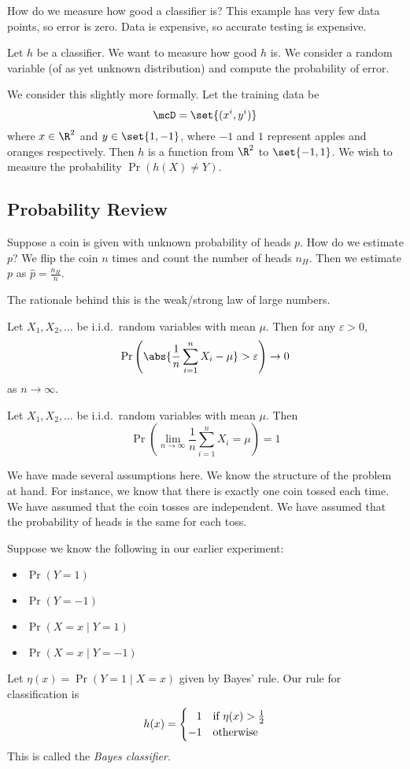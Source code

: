 How do we measure how good a classifier is?
This example has very few data points, so error is zero.
Data is expensive, so accurate testing is expensive.

Let $h$ be a classifier.
We want to measure how good $h$ is.
We consider a random variable (of as yet unknown distribution) and compute
the probability of error.

We consider this slightly more formally.
Let the training data be \[
    \mcD = \set{(x^i, y^i)}
\] where $x \in \R^2$ and $y \in \set{1, -1}$, where $-1$ and $1$ represent
apples and oranges respectively.
Then $h$ is a function from $\R^2$ to $\set{-1, 1}$.
We wish to measure the probability $\Pr(h(X) \ne Y)$.

\subsection{Probability Review} \label{sec:probability_review}
Suppose a coin is given with unknown probability of heads $p$.
How do we estimate $p$?
We flip the coin $n$ times and count the number of heads $n_H$.
Then we estimate $p$ as $\hat{p} = \frac{n_H}{n}$.

The rationale behind this is the weak/strong law of large numbers.
\begin{theorem} \label{thm:probability_review:wlln}
    Let $X_1, X_2, \ldots$ be i.i.d.~random variables with mean $\mu$.
    Then for any $\varepsilon > 0$, \[
        \Pr\left(\abs{\frac{1}{n} \sum_{i=1}^n X_i - \mu} > \varepsilon\right)
        \to 0
    \] as $n \to \infty$.
\end{theorem}

\begin{theorem} \label{thm:probability_review:slln}
    Let $X_1, X_2, \ldots$ be i.i.d.~random variables with mean $\mu$.
    Then \[
        \Pr\left(\lim_{n \to \infty} \frac{1}{n} \sum_{i=1}^n X_i = \mu\right)
        = 1
    \]
\end{theorem}
We have made several assumptions here.
We know the structure of the problem at hand.
For instance, we know that there is exactly one coin tossed each time.
We have assumed that the coin tosses are independent.
We have assumed that the probability of heads is the same for each toss.

Suppose we know the following in our earlier experiment:
\begin{itemize}
    \item $\Pr(Y = 1)$
    \item $\Pr(Y = -1)$
    \item $\Pr(X = x \mid Y = 1)$
    \item $\Pr(X = x \mid Y = -1)$
\end{itemize}
Let $\eta(x) = \Pr(Y = 1 \mid X = x)$ given by Bayes' rule.
Our rule for classification is \[
    h(x) = \begin{cases}
        \hphantom{-}1 & \text{if } \eta(x) > \frac{1}{2} \\
        -1 & \text{otherwise}
    \end{cases}
\] This is called the \emph{Bayes classifier}.

